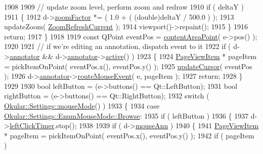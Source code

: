 \begin{DoxyCode}
1908 
1909         \textcolor{comment}{// update zoom level, perform zoom and redraw}
1910         \textcolor{keywordflow}{if} ( deltaY )
1911         \{
1912             d->\hyperlink{classPageViewPrivate_a938411ef880f839b765aeac48a482b9e}{zoomFactor} *= ( 1.0 + ( (double)deltaY / 500.0 ) );
1913             updateZoom( \hyperlink{classPageView_af489dc2492677bb4f422660627f62aecab9583485dc9e9287fc1fc02392c5a47b}{ZoomRefreshCurrent} );
1914             viewport()->repaint();
1915         \}
1916         \textcolor{keywordflow}{return};
1917     \}
1918 
1919     \textcolor{keyword}{const} QPoint eventPos = \hyperlink{classPageView_a7f432d3d6d05c69b568ad66a9c232cd7}{contentAreaPoint}( e->pos() );
1920 
1921     \textcolor{comment}{// if we're editing an annotation, dispatch event to it}
1922     \textcolor{keywordflow}{if} ( d->\hyperlink{classPageViewPrivate_a07bad73b61f6b400411aacc7e2e820a0}{annotator} && d->\hyperlink{classPageViewPrivate_a07bad73b61f6b400411aacc7e2e820a0}{annotator}->\hyperlink{classPageViewAnnotator_ae7fcfee911a4eb7811865863d852ffac}{active}() )
1923     \{
1924         \hyperlink{classPageViewItem}{PageViewItem} * pageItem = pickItemOnPoint( eventPos.x(), eventPos.y() );
1925         \hyperlink{classPageView_a0054ba6d2967fa31dea42dcc9d9020b6}{updateCursor}( eventPos );
1926         d->\hyperlink{classPageViewPrivate_a07bad73b61f6b400411aacc7e2e820a0}{annotator}->\hyperlink{classPageViewAnnotator_a6cd952408052c6d7de1c1111d61266b0}{routeMouseEvent}( e, pageItem );
1927         \textcolor{keywordflow}{return};
1928     \}
1929 
1930     \textcolor{keywordtype}{bool} leftButton = (e->buttons() == Qt::LeftButton);
1931     \textcolor{keywordtype}{bool} rightButton = (e->buttons() == Qt::RightButton);
1932     \textcolor{keywordflow}{switch} ( \hyperlink{classOkular_1_1Settings_af8e39e25e841b413d67af2cb4dfc0688}{Okular::Settings::mouseMode}() )
1933     \{
1934         \textcolor{keywordflow}{case} \hyperlink{classOkular_1_1Settings_1_1EnumMouseMode_ab2ae04e2d7d069f02195ccf32c52415bae5c77f74b0cf35d7838da1baaad4e822}{Okular::Settings::EnumMouseMode::Browse}:
1935             \textcolor{keywordflow}{if} ( leftButton )
1936             \{
1937                 d->\hyperlink{classPageViewPrivate_ac0d8482663a19cc6798a2c3b39f78d0e}{leftClickTimer}.stop();
1938 
1939                 \textcolor{keywordflow}{if} ( d->\hyperlink{classPageViewPrivate_ac92373de9a9cb5f2085b186a7e321a3b}{mouseAnn} )
1940                 \{
1941                     \hyperlink{classPageViewItem}{PageViewItem} * pageItem = pickItemOnPoint( eventPos.x(), eventPos.y() );
1942                     \textcolor{keywordflow}{if} ( pageItem )

\end{DoxyCode}
